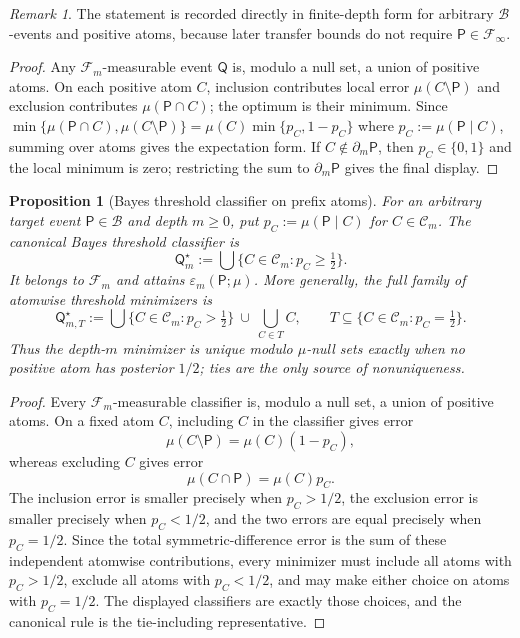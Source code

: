 \documentclass{etds}%
\numberwithin{equation}{section}
\theoremstyle{plain}
\newtheorem{proposition}[theorem]{Proposition}
\theoremstyle{definition}
\theoremstyle{remark}
\newtheorem{remark}[theorem]{Remark}
\begin{document}
\begin{remark}
The statement is recorded directly in finite-depth form for arbitrary
$\mathcal{B}$-events and positive atoms, because later transfer bounds do not
require $\mathsf{P}\in\mathcal{F}_\infty$.
\end{remark}

\begin{proof}
Any $\mathcal{F}_m$-measurable event $\mathsf{Q}$ is, modulo a null set, a
union of positive atoms.  On each positive atom $C$, inclusion contributes
local error $\mu(C\setminus\mathsf{P})$ and exclusion contributes
$\mu(\mathsf{P}\cap C)$; the optimum is their minimum.  Since
$\min\{\mu(\mathsf{P}\cap C),\mu(C\setminus\mathsf{P})\}=\mu(C)\min\{p_C,1-p_C\}$
where $p_C:=\mu(\mathsf{P}\mid C)$, summing over atoms gives the expectation
form.  If $C\notin\partial_m\mathsf{P}$, then $p_C\in\{0,1\}$ and the local
minimum is zero; restricting the sum to $\partial_m\mathsf{P}$ gives the final
display.
\end{proof}

\begin{proposition}[Bayes threshold classifier on prefix atoms]
\label{prop:bayes-threshold-classifier}
For an arbitrary target event $\mathsf{P}\in\mathcal{B}$ and depth $m\ge 0$,
put $p_C:=\mu(\mathsf{P}\mid C)$ for $C\in\mathcal{C}_m$.  The canonical
Bayes threshold classifier is
\[
\mathsf{Q}_m^\star
:=\bigcup\{C\in\mathcal{C}_m:p_C\ge \tfrac12\}.
\]
It belongs to $\mathcal{F}_m$ and attains
$\varepsilon_m(\mathsf{P};\mu)$.  More generally, the full family of
atomwise threshold minimizers is
\[
\mathsf{Q}_{m,T}^\star
:=\bigcup\{C\in\mathcal{C}_m:p_C>\tfrac12\}\ \cup\
  \bigcup_{C\in T} C,
\qquad
T\subseteq\{C\in\mathcal{C}_m:p_C=\tfrac12\}.
\]
Thus the depth-$m$ minimizer is unique modulo $\mu$-null sets exactly when no
positive atom has posterior $1/2$; ties are the only source of nonuniqueness.
\end{proposition}

\begin{proof}
Every $\mathcal{F}_m$-measurable classifier is, modulo a null set, a union of
positive atoms.  On a fixed atom $C$, including $C$ in the classifier gives
error
\[
\mu(C\setminus\mathsf{P})=\mu(C)(1-p_C),
\]
whereas excluding $C$ gives error
\[
\mu(C\cap\mathsf{P})=\mu(C)p_C.
\]
The inclusion error is smaller precisely when $p_C>1/2$, the exclusion error
is smaller precisely when $p_C<1/2$, and the two errors are equal precisely
when $p_C=1/2$.  Since the total symmetric-difference error is the sum of
these independent atomwise contributions, every minimizer must include all
atoms with $p_C>1/2$, exclude all atoms with $p_C<1/2$, and may make either
choice on atoms with $p_C=1/2$.  The displayed classifiers are exactly those
choices, and the canonical rule is the tie-including representative.
\end{proof}
\end{document}
